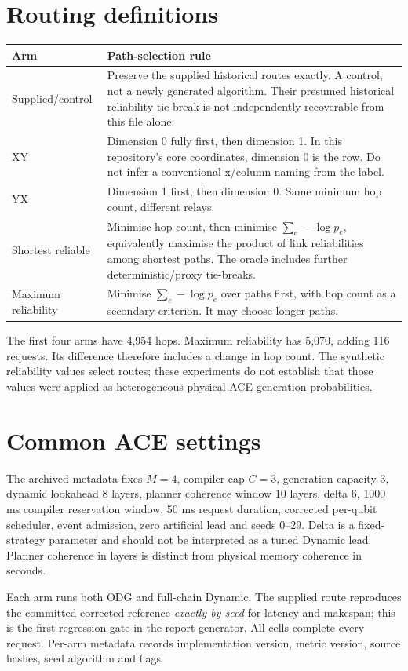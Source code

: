 \documentclass[11pt,a4paper,oneside]{report}
\begin{document}
\section{Routing definitions}
\begin{longtable}{p{.25\linewidth}p{.67\linewidth}}
\toprule Arm & Path-selection rule\\\midrule\endhead
Supplied/control & Preserve the supplied historical routes exactly. A control, not a newly generated algorithm. Their presumed historical reliability tie-break is not independently recoverable from this file alone.\\
XY & Dimension 0 fully first, then dimension 1. In this repository's core coordinates, dimension 0 is the row. Do not infer a conventional x/column naming from the label.\\
YX & Dimension 1 first, then dimension 0. Same minimum hop count, different relays.\\
Shortest reliable & Minimise hop count, then minimise $\sum_e-\log p_e$, equivalently maximise the product of link reliabilities among shortest paths. The oracle includes further deterministic/proxy tie-breaks.\\
Maximum reliability & Minimise $\sum_e-\log p_e$ over paths first, with hop count as a secondary criterion. It may choose longer paths.\\
\bottomrule
\end{longtable}
The first four arms have 4,954 hops. Maximum reliability has 5,070, adding 116 requests. Its difference therefore includes a change in hop count. The synthetic reliability values select routes; these experiments do not establish that those values were applied as heterogeneous physical ACE generation probabilities.

\section{Common ACE settings}
The archived metadata fixes $M=4$, compiler cap $C=3$, generation capacity 3, dynamic lookahead 8 layers, planner coherence window 10 layers, delta 6, 1000 ms compiler reservation window, 50 ms request duration, corrected per-qubit scheduler, event admission, zero artificial lead and seeds 0--29. Delta is a fixed-strategy parameter and should not be interpreted as a tuned Dynamic lead. Planner coherence in layers is distinct from physical memory coherence in seconds.

Each arm runs both ODG and full-chain Dynamic. The supplied route reproduces the committed corrected reference \emph{exactly by seed} for latency and makespan; this is the first regression gate in the report generator. All cells complete every request. Per-arm metadata records implementation version, metric version, source hashes, seed algorithm and flags.
\end{document}
